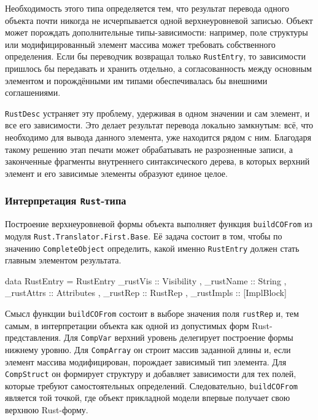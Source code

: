 \documentclass[a4paper,12pt]{article}
\begin{document}
Необходимость этого типа определяется тем, что результат перевода одного объекта почти
никогда не исчерпывается одной верхнеуровневой записью. Объект может порождать
дополнительные типы-зависимости: например, поле структуры или модифицированный элемент
массива может требовать собственного определения. Если бы переводчик возвращал только
\texttt{RustEntry}, то зависимости пришлось бы передавать и хранить отдельно, а
согласованность между основным элементом и порождёнными им типами обеспечивалась бы
внешними соглашениями.

\texttt{RustDesc} устраняет эту проблему, удерживая в одном значении и сам элемент, и
все его зависимости. Это делает результат перевода локально замкнутым: всё, что
необходимо для вывода данного элемента, уже находится рядом с ним. Благодаря такому
решению этап печати может обрабатывать не разрозненные записи, а законченные фрагменты
внутреннего синтаксического дерева, в которых верхний элемент и его зависимые элементы
образуют единое целое.

\subsubsection{Интерпретация \texttt{Rust}-типа}

Построение верхнеуровневой формы объекта выполняет функция \texttt{buildCOFrom} из
модуля \texttt{Rust.Translator.First.Base}. Её задача состоит в том, чтобы по значению
\texttt{CompleteObject} определить, какой именно \texttt{RustEntry} должен стать главным
элементом результата.

\begin{flushleft}
\label{lst:rust-entry}
\begin{MyCodes}
data RustEntry = RustEntry
  { _rustVis   :: Visibility
  , _rustName  :: String
  , _rustAttrs :: Attributes
  , _rustRep   :: RustRep
  , _rustImpls :: [ImplBlock]
  }
\end{MyCodes}
\end{flushleft}

Смысл функции \texttt{buildCOFrom} состоит в выборе значения поля \texttt{rustRep} и,
тем самым, в интерпретации объекта как одной из допустимых форм Rust-представления.
Для \texttt{CompVar} верхний уровень делегирует построение формы нижнему уровню. Для
\texttt{CompArray} он строит массив заданной длины и, если элемент массива модифицирован,
порождает зависимый тип элемента. Для \texttt{CompStruct} он формирует структуру и
добавляет зависимости для тех полей, которые требуют самостоятельных определений.
Следовательно, \texttt{buildCOFrom} является той точкой, где объект прикладной модели
впервые получает свою верхнюю Rust-форму.
\end{document}

